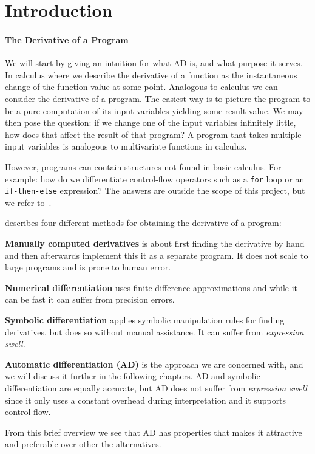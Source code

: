 \section{Introduction}

\paragraph{The Derivative of a Program}   We will start by giving an intuition
for what AD is, and what purpose it serves.  In calculus where we describe the
derivative of a function as the instantaneous change of the function value at
some point.  Analogous to calculus we can consider the derivative of a program.
The easiest way is to picture the program to be a pure computation of its input
variables yielding some result value.  We may then pose the question:  if we
change one of the input variables infinitely little, how does that affect the
result of that program?  A program that takes multiple input variables is
analogous to multivariate functions in calculus.

However, programs can contain structures not found in basic calculus.  For
example:  how do we differentiate control-flow operators such as a
\texttt{for} loop or an \texttt{if-then-else} expression?  The answers are
outside the scope of this project, but we refer to~\cite{adsurvey}.

\cite{adsurvey} describes four different methods for obtaining the
derivative of a program:
\begin{enumerate*}[label=(\arabic*)]

  \item \textbf{Manually computed derivatives} is about first finding the derivative
  by hand and then afterwards implement this it as a separate program.  It does
    not scale to large programs and is prone to human error.

  \item \textbf{Numerical differentiation} uses finite difference
  approximations and while it can be fast it can suffer from precision errors.

\item \textbf{Symbolic differentiation}  applies symbolic manipulation
  rules for finding derivatives, but does so without manual assistance. It can
    suffer from \textit{expression swell}.

  \item \textbf{Automatic differentiation (AD)} is the approach we are concerned with,
  and we will discuss it further in the following chapters.
  AD and symbolic differentiation are equally accurate, but AD does not suffer
    from \textit{expression swell} since it only uses a constant overhead during
    interpretation and it supports control flow.

\end{enumerate*}

From this brief overview we see that AD has properties that makes it
attractive and preferable over other the alternatives.
